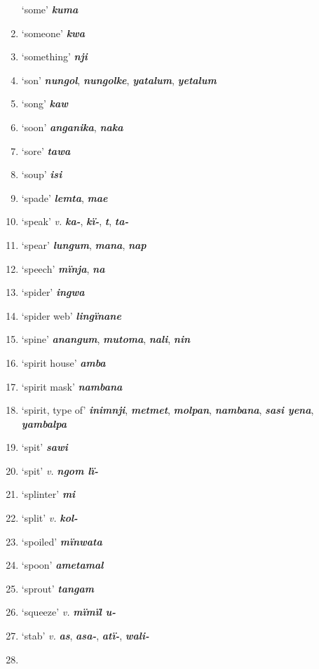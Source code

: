 \begin{enumerate}[noitemsep, label={}, align=left, widest=190, labelsep=1ex,leftmargin=*,itemindent=-10pt]
‘some’ \textbf{\textit{kuma}} \item
‘someone’ \textbf{\textit{kwa}} \item
‘something’ \textbf{\textit{nji}} \item
‘son’ \textbf{\textit{nungol}}, \textbf{\textit{nungolke}}, \textbf{\textit{yatalum}}, \textbf{\textit{yetalum}} \item
‘song’ \textbf{\textit{kaw}} \item
‘soon’ \textbf{\textit{anganika}}, \textbf{\textit{naka}} \item
‘sore’ \textbf{\textit{tawa}} \item
‘soup’ \textbf{\textit{isi}} \item
‘spade’ \textbf{\textit{lemta}}, \textbf{\textit{mae}} \item
‘speak’ \textit{v.} \textbf{\textit{ka-}}, \textbf{\textit{kï-}}, \textbf{\textit{t}}, \textbf{\textit{ta-}} \item
‘spear’ \textbf{\textit{lungum}}, \textbf{\textit{mana}}, \textbf{\textit{nap}} \item
‘speech’ \textbf{\textit{mïnja}}, \textbf{\textit{na}} \item
‘spider’ \textbf{\textit{ingwa}} \item
‘spider web’ \textbf{\textit{lingïnane}} \item
‘spine’ \textbf{\textit{anangum}}, \textbf{\textit{mutoma}}, \textbf{\textit{nali}}, \textbf{\textit{nin}} \item
‘spirit house’ \textbf{\textit{amba}} \item
‘spirit mask’ \textbf{\textit{nambana}} \item
‘spirit, type of’ \textbf{\textit{inimnji}}, \textbf{\textit{metmet}}, \textbf{\textit{molpan}}, \textbf{\textit{nambana}}, \textbf{\textit{sasi yena}}, \textbf{\textit{yambalpa}} \item
‘spit’ \textbf{\textit{sawi}} \item
‘spit’ \textit{v.} \textbf{\textit{ngom lï-}} \item
‘splinter’ \textbf{\textit{mi}} \item
‘split’ \textit{v.} \textbf{\textit{kol-}} \item
‘spoiled’ \textbf{\textit{mïnwata}} \item
‘spoon’ \textbf{\textit{ametamal}} \item
‘sprout’ \textbf{\textit{tangam}} \item
‘squeeze’ \textit{v.} \textbf{\textit{mïmïl u-}} \item
‘stab’ \textit{v.} \textbf{\textit{as}}, \textbf{\textit{asa-}}, \textbf{\textit{atï-}}, \textbf{\textit{wali-}} \item

\end{enumerate}
